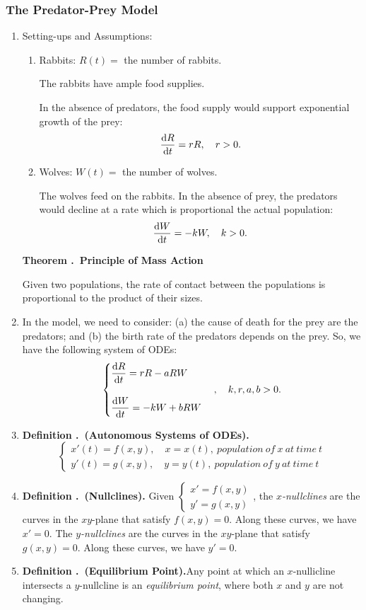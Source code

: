 \documentclass[12pt, a4paper]{article}
\newcounter{index}[subsection]
\newenvironment*{df}[1]{\par\noindent\textbf{Definition \thesubsection.\stepcounter{index}\theindex\ (#1).}}{\par}
\newenvironment*{thm}[1]{\begin{tcolorbox}\par\noindent\textbf{Theorem \thesubsection.\stepcounter{index}\theindex\ #1} \par}{\par\end{tcolorbox}}
\def\dsst{\displaystyle}
\begin{document}
\subsubsection{The Predator-Prey Model}
\begin{enumerate}
	\item Setting-ups and Assumptions: 
	\begin{enumerate}
		\item Rabbits: $R(t)=$ the number of rabbits. \par The rabbits have ample food supplies.\par In the absence of predators, the food supply would support exponential growth of the prey: \[\dv{R}{t}=rR,\quad r>0.\]
		\item Wolves: $W(t)=$ the number of wolves. \par The wolves feed on the rabbits. In the absence of prey, the predators would decline at a rate which is proportional the actual population: \[\dv{W}{t}=-kW,\quad k>0.\]
	\end{enumerate}
	\begin{thm}{Principle of Mass Action}
	Given two populations, the rate of contact between the populations is proportional to the product of their sizes.
 	\end{thm}
 	\item In the model, we need to consider: (a) the cause of death for the prey are the predators; and (b) the birth rate of the predators depends on the prey. So, we have the following system of ODEs: \[\begin{cases}\dsst\dv{R}{t}=rR-aRW\\\\\dsst\dv{W}{t}=-kW+bRW\end{cases},\quad k,r,a,b>0.\]
 	\item \begin{df}{Autonomous Systems of ODEs}\[\begin{cases}x'(t)=f(x,y),\quad x=x(t),\ population\ of\ x\ at\ time \ t\\y'(t)=g(x,y), \quad y=y(t),\ population\ of\ y\ at\ time \ t\end{cases}\]\end{df}
 	\item \begin{df}{Nullclines} Given $\begin{cases}x'=f(x,y)\\y'=g(x,y)\end{cases}$, the \textit{$x$-nullclines} are the curves in the $xy$-plane that satisfy $f(x,y)=0$. Along these curves, we have $x'=0$. The \textit{$y$-nullclines} are the curves in the $xy$-plane that satisfy $g(x,y)=0$. Along these curves, we have $y'=0$.\end{df}
 	\item \begin{df}{Equilibrium Point}Any point at which an $x$-nullicline intersects a $y$-nullcline is an \textit{equilibrium point}, where both $x$ and $y$ are not changing. \end{df}
\end{enumerate}
\end{document}
